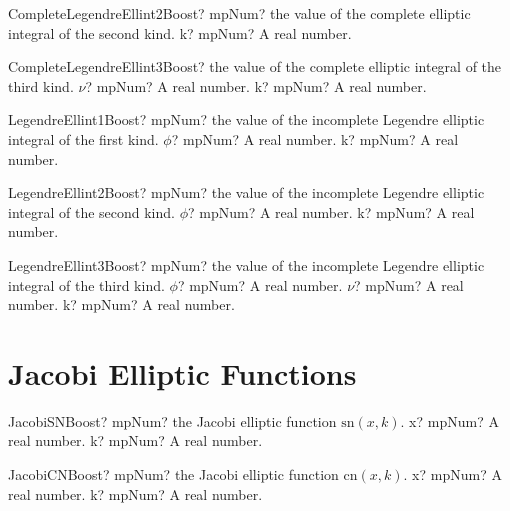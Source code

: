 \documentclass[12pt,a4paper,openany]{book}
\begin{document}
\begin{mpFunctionsExtract}
\mpFunctionOne
{CompleteLegendreEllint2Boost? mpNum? the value of the complete elliptic integral of the second kind.}
{k? mpNum? A real number.}
\end{mpFunctionsExtract}

\begin{mpFunctionsExtract}
\mpFunctionTwo
{CompleteLegendreEllint3Boost? the value of the complete elliptic integral of the third kind.}
{$\nu$? mpNum? A real number.}
{k? mpNum? A real number.}
\end{mpFunctionsExtract}

\begin{mpFunctionsExtract}
\mpFunctionTwo
{LegendreEllint1Boost? mpNum? the value of the incomplete Legendre elliptic integral of the first kind.}
{$\phi$? mpNum? A real number.}
{k? mpNum? A real number.}
\end{mpFunctionsExtract}

\begin{mpFunctionsExtract}
\mpFunctionTwo
{LegendreEllint2Boost? mpNum? the value of the incomplete Legendre elliptic integral of the second kind.}
{$\phi$? mpNum? A real number.}
{k? mpNum? A real number.}
\end{mpFunctionsExtract}

\begin{mpFunctionsExtract}
\mpFunctionThree
{LegendreEllint3Boost? mpNum? the value of the incomplete Legendre elliptic integral of the third kind.}
{$\phi$? mpNum? A real number.}
{$\nu$? mpNum? A real number.}
{k? mpNum? A real number.}
\end{mpFunctionsExtract}

\section{Jacobi Elliptic Functions}

\begin{mpFunctionsExtract}
\mpFunctionTwo
{JacobiSNBoost? mpNum? the Jacobi elliptic function $\text{sn}(x, k)$.}
{x? mpNum? A real number.}
{k? mpNum? A real number.}
\end{mpFunctionsExtract}

\begin{mpFunctionsExtract}
\mpFunctionTwo
{JacobiCNBoost? mpNum? the Jacobi elliptic function $\text{cn}(x, k)$.}
{x? mpNum? A real number.}
{k? mpNum? A real number.}
\end{mpFunctionsExtract}
\end{document}
